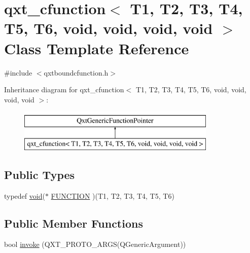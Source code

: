 \hypertarget{classqxt__cfunction_3_01_t1_00_01_t2_00_01_t3_00_01_t4_00_01_t5_00_01_t6_00_01void_00_01void_00_01void_00_01void_01_4}{\section{qxt\-\_\-cfunction$<$ T1, T2, T3, T4, T5, T6, void, void, void, void $>$ Class Template Reference}
\label{classqxt__cfunction_3_01_t1_00_01_t2_00_01_t3_00_01_t4_00_01_t5_00_01_t6_00_01void_00_01void_00_01void_00_01void_01_4}
}


{\ttfamily \#include $<$qxtboundcfunction.\-h$>$}

Inheritance diagram for qxt\-\_\-cfunction$<$ T1, T2, T3, T4, T5, T6, void, void, void, void $>$\-:\begin{figure}[H]
\begin{center}
\leavevmode
\includegraphics[height=2.000000cm]{classqxt__cfunction_3_01_t1_00_01_t2_00_01_t3_00_01_t4_00_01_t5_00_01_t6_00_01void_00_01void_00_01void_00_01void_01_4}
\end{center}
\end{figure}
\subsection*{Public Types}
\begin{DoxyCompactItemize}
\item 
typedef \hyperlink{group___u_a_v_objects_plugin_ga444cf2ff3f0ecbe028adce838d373f5c}{void}($\ast$ \hyperlink{classqxt__cfunction_3_01_t1_00_01_t2_00_01_t3_00_01_t4_00_01_t5_00_01_t6_00_01void_00_01void_00_01void_00_01void_01_4_ad065c3b6117a01910e5e31c9d1d0e050}{F\-U\-N\-C\-T\-I\-O\-N} )(T1, T2, T3, T4, T5, T6)
\end{DoxyCompactItemize}
\subsection*{Public Member Functions}
\begin{DoxyCompactItemize}
\item 
bool \hyperlink{classqxt__cfunction_3_01_t1_00_01_t2_00_01_t3_00_01_t4_00_01_t5_00_01_t6_00_01void_00_01void_00_01void_00_01void_01_4_a0bce091f67b0aeca249656a5275d5c62}{invoke} (Q\-X\-T\-\_\-\-P\-R\-O\-T\-O\-\_\-A\-R\-G\-S(Q\-Generic\-Argument))
\end{DoxyCompactItemize}

